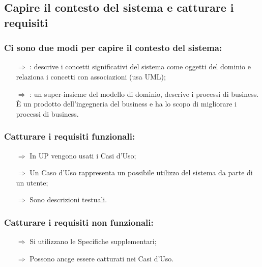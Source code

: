 
\subsection{Capire il contesto del sistema e catturare i requisiti}

\subsubsection{Ci sono due modi per capire il contesto del sistema:}

\begin{itemize}
    \item [$\Rightarrow$] : descrive i concetti significativi del sistema come oggetti del dominio e relaziona i concetti con associazioni (usa UML);
    \item [$\Rightarrow$] : un super-insieme del modello di dominio, descrive i processi di business. È un prodotto dell'ingegneria del business e ha lo scopo di migliorare i processi di business. 
\end{itemize}


\subsubsection{Catturare i requisiti funzionali:}

\begin{itemize}
    \item [$\Rightarrow$] In UP vengono usati i Casi d'Uso;
    \item [$\Rightarrow$] Un Caso d'Uso rappresenta un possibile utilizzo del sistema da parte di un utente;
    \item [$\Rightarrow$] Sono descrizioni testuali.
\end{itemize}

\subsubsection{Catturare i requisiti non funzionali:}

\begin{itemize}
    \item [$\Rightarrow$] Si utilizzano le Specifiche supplementari;
    \item [$\Rightarrow$] Possono ancge essere catturati nei Casi d'Uso.
\end{itemize}


